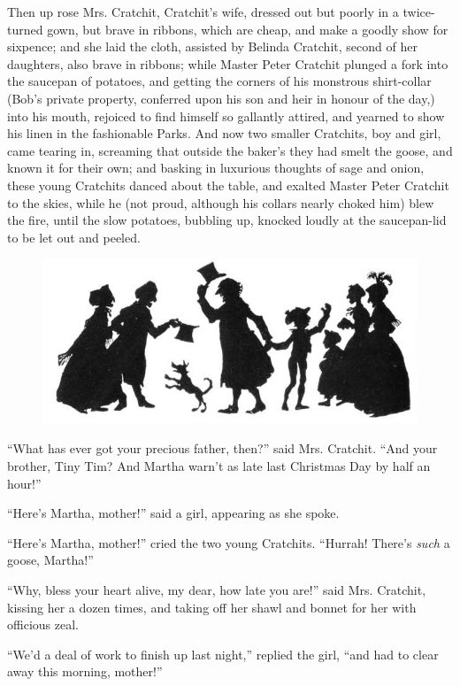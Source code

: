 \documentclass[paper=a5,BCOR=15mm,twoside,DIV=15,headinclude=off,12pt,chapterprefix=off,openany,headings=huge]{scrbook} %
\begin{document}
Then up rose Mrs. Cratchit, Cratchit's wife, dressed out but poorly in a twice-turned gown, but brave in ribbons, which are cheap, and make a goodly show for sixpence; and she laid the cloth, assisted by Belinda Cratchit, second of her daughters, also brave in ribbons; while Master Peter Cratchit plunged a fork into the saucepan of potatoes, and getting the corners of his monstrous shirt-collar (Bob's private property, conferred upon his son and heir in honour of the day,) into his mouth, rejoiced to find himself so gallantly attired, and yearned to show his linen in the fashionable Parks. And now two smaller Cratchits, boy and girl, came tearing in, screaming that outside the baker's they had smelt the goose, and known it for their own; and basking in luxurious thoughts of sage and onion, these young Cratchits danced about the table, and exalted Master Peter Cratchit to the skies, while he (not proud, although his collars nearly choked him) blew the fire, until the slow potatoes, bubbling up, knocked loudly at the saucepan-lid to be let out and peeled.
\cleardoubleevenemptypage
\begin{figure}
\centering
\includegraphics[width=\linewidth]{gs109}
\end{figure}

\enquote{What has ever got your precious father, then?} said Mrs. Cratchit. \enquote{And your brother, Tiny Tim? And Martha warn't as late last Christmas Day by half an hour!}

\enquote{Here's Martha, mother!} said a girl, appearing as she spoke.

\enquote{Here's Martha, mother!} cried the two young Cratchits. \enquote{Hurrah! There's \textit{such} a goose, Martha!}

\enquote{Why, bless your heart alive, my dear, how late you are!} said Mrs. Cratchit, kissing her a dozen times, and taking off her shawl and bonnet for her with officious zeal.

\enquote{We'd a deal of work to finish up last night,} replied the girl, \enquote{and had to clear away this morning, mother!}
\end{document}
